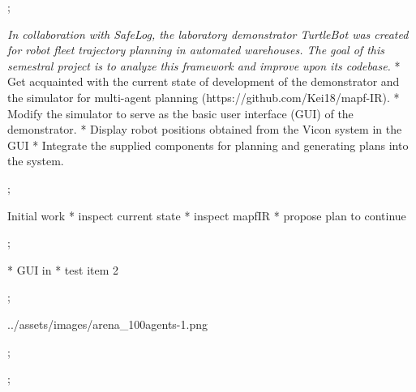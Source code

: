 

\worktype[B/EN]

\slideshow



\pg;


\textit {
    In collaboration with SafeLog, the laboratory demonstrator TurtleBot was created
    for robot fleet trajectory planning in automated warehouses. The goal of this semestral
    project is to analyze this framework and improve upon its codebase.
}
\begitems
* Get acquainted with the current state of development of the demonstrator and the simulator for multi-agent planning (https://github.com/Kei18/mapf-IR).
* Modify the simulator to serve as the basic user interface (GUI) of the demonstrator.
* Display robot positions obtained from the Vicon system in the GUI
* Integrate the supplied components for planning and generating plans into the system.
\enditems
\nl

\pg;



Initial work
\begitems
* inspect current state
* inspect mapfIR
* propose plan to continue
\enditems

\pg;


\begitems
* GUI in 
* test item 2
\enditems
\nl

\pg;



\centerline{\picw=14cm \inspic ../assets/images/arena_100agents-1.png }

\pg;


\midinsert
\endinsert

\pg;

